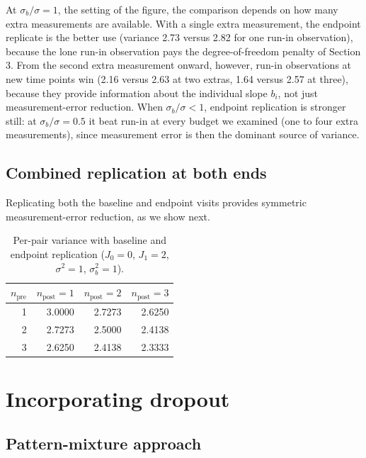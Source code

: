 \documentclass[
  11pt,
]{article}
\begin{document}
At \(\sigma_b / \sigma = 1\), the setting of the figure,
the comparison depends on how many extra measurements
are available. With a single extra measurement, the
endpoint replicate is the better use (variance 2.73
versus 2.82 for one run-in observation), because the
lone run-in observation pays the degree-of-freedom
penalty of Section 3. From the second extra measurement
onward, however, run-in observations at new time points
win (2.16 versus 2.63 at two extras, 1.64 versus 2.57 at
three), because they provide information about the
individual slope \(b_i\), not just measurement-error
reduction. When \(\sigma_b / \sigma < 1\), endpoint
replication is stronger still: at \(\sigma_b / \sigma =
0.5\) it beat run-in at every budget we examined (one to
four extra measurements), since measurement error is
then the dominant source of variance.

\subsection{Combined replication at both ends}\label{combined-replication-at-both-ends}

Replicating both the baseline and endpoint visits
provides symmetric measurement-error reduction, as we
show next.

\begin{table}

\caption{\label{tab:both-ends}Per-pair variance with baseline and endpoint replication ($J_0=0$, $J_1=2$, $\sigma^2=1$, $\sigma_b^2=1$).}
\centering
\begin{tabular}[t]{rrrr}
\toprule
$n_{\text{pre}}$ & $n_{\text{post}}=1$ & $n_{\text{post}}=2$ & $n_{\text{post}}=3$\\
\midrule
1 & 3.0000 & 2.7273 & 2.6250\\
2 & 2.7273 & 2.5000 & 2.4138\\
3 & 2.6250 & 2.4138 & 2.3333\\
\bottomrule
\end{tabular}
\end{table}

\section{Incorporating dropout}\label{incorporating-dropout}

\subsection{Pattern-mixture approach}\label{pattern-mixture-approach}
\end{document}
